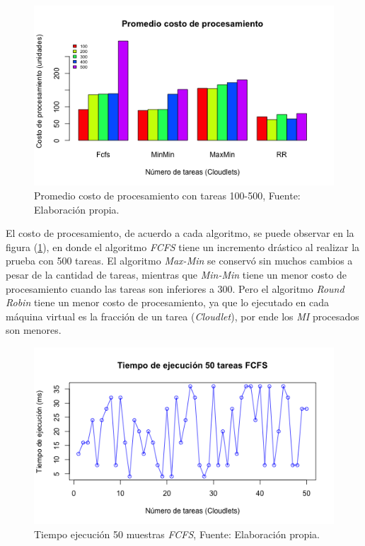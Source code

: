 \documentclass[jou,apacite]{apa6}
\begin{document}
\renewcommand\thefigure{\arabic{figure}}
\begin{figure}[h!] 
	\centering
	\includegraphics[scale=0.5]{media/costoproce}
	\caption{Promedio costo de procesamiento con tareas 100-500, Fuente: Elaboraci\'on propia.}
	\label{fig:costo}
\end{figure}


El costo de procesamiento, de acuerdo a cada algoritmo, se puede observar en la figura (\ref{fig:costo}), en donde el algoritmo \textit{FCFS} tiene un incremento dr\'astico al realizar la prueba con 500 tareas. El algoritmo \textit{Max-Min} se conserv\'o sin muchos cambios a pesar de la cantidad de tareas, mientras que \textit{Min-Min} tiene un menor costo de procesamiento cuando las tareas son inferiores a 300. Pero el algoritmo \textit{Round Robin} tiene un menor costo de procesamiento, ya que lo ejecutado en cada máquina virtual es la fracción de un tarea (\textit{Cloudlet}), por ende los \textit{MI} procesados son menores.
\label{etiqueta2}

\renewcommand\thefigure{\arabic{figure}}
\begin{figure}[h!] 
	\centering
	\includegraphics[scale=0.5]{media/fcfs}
	\caption{Tiempo ejecuci\'on 50 muestras \textit{FCFS}, Fuente: Elaboraci\'on propia.}
	\label{fig:ejecucion}
\end{figure}
\end{document}
